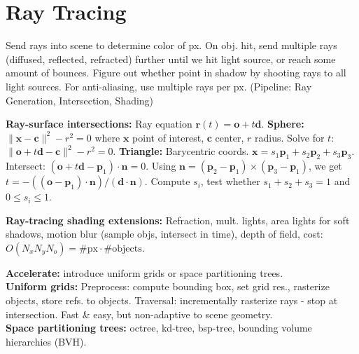 \documentclass[a4paper,9pt]{article}
\begin{document}
\section{Ray Tracing}
\begin{subbox}{}
Send rays into scene to determine color of px. On obj. hit, send multiple rays (diffused, reflected, refracted) further until we hit light source, or reach some amount of bounces. Figure out whether point in shadow by shooting rays to all light sources. For anti-aliasing, use multiple rays per px. (Pipeline: Ray Generation, Intersection, Shading)
\end{subbox}
\textbf{Ray-surface intersections:} Ray equation $\mathbf{r}(t) = \mathbf{o} + t \mathbf{d}$. \textbf{Sphere:} $\|\mathbf{x} - \mathbf{c}\|^2 - r^2 = 0$ where $\mathbf{x}$ point of interest, $\mathbf{c}$ center, $r$ radius. Solve for $t$: $\|\mathbf{o} + t \mathbf{d} - \mathbf{c}\|^2 - r^2 = 0$. \textbf{Triangle:} Barycentric coords. $\mathbf{x} = s_1 \mathbf{p}_1 + s_2 \mathbf{p}_2 + s_3 \mathbf{p}_3$. Intersect: $(\mathbf{o} + t \mathbf{d} - \mathbf{p}_1) \cdot \mathbf{n} = 0$. Using $\mathbf{n} = (\mathbf{p}_2 - \mathbf{p}_1) \times (\mathbf{p}_3 - \mathbf{p}_1)$, we get $t = -((\mathbf{o} - \mathbf{p}_1) \cdot \mathbf{n}) / (\mathbf{d} \cdot \mathbf{n})$. Compute $s_i$, test whether $s_1 + s_2 + s_3 = 1$ and $0 \le s_i \le 1$.

\textbf{Ray-tracing shading extensions:} Refraction, mult. lights, area lights for soft shadows, motion blur (sample objs, intersect in time), depth of field, cost: $O(N_x N_y N_o) = \#\text{px} \cdot \#\text{objects}$.

\textbf{Accelerate:} introduce uniform grids or space partitioning trees.\\
\textbf{Uniform grids:} Preprocess: compute bounding box, set grid res., rasterize objects, store refs. to objects. Traversal: incrementally rasterize rays - stop at intersection. Fast \& easy, but non-adaptive to scene geometry.\\
\textbf{Space partitioning trees:} octree, kd-tree, bsp-tree, bounding volume hierarchies (BVH).
\end{document}
